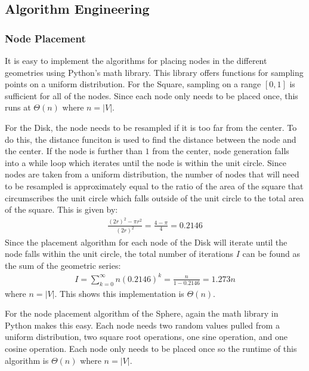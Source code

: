 \documentclass{article}
\begin{document}

    \subsection{Algorithm Engineering}

        \subsubsection{Node Placement}
        It is easy to implement the algorithms for placing nodes in the different geometries using Python's math library. This library offers functions for sampling points on a uniform distribution. For the Square, sampling on a range $[0,1]$ is sufficient for all of the nodes. Since each node only needs to be placed once, this runs at $\Theta(n)$ where $n = |V|$.
        \par
        For the Disk, the node needs to be resampled if it is too far from the center. To do this, the distance funciton is used to find the distance between the node and the center. If the node is further than $1$ from the center, node generation falls into a while loop which iterates until the node is within the unit circle. Since nodes are taken from a uniform distribution, the number of nodes that will need to be resampled is approximately equal to the ratio of the area of the square that circumscribes the unit circle which falls outside of the unit circle to the total area of the square. This is given by:
        \begin{align}
            \frac{(2r)^2-\pi r^2}{(2r)^2} = \frac{4-\pi}{4} = 0.2146
        \end{align}
        Since the placement algorithm for each node of the Disk will iterate until the node falls within the unit circle, the total number of iterations $I$ can be found as the sum of the geometric series:
        \begin{align}
            I = \sum_{k=0}^{\infty} n (0.2146)^k = \frac{n}{1-0.2146} = 1.273n
        \end{align}
        where $n = |V|$. This shows this implementation is $\Theta\left(n\right)$.
        \par
        For the node placement algorithm of the Sphere, again the math library in Python makes this easy. Each node needs two random values pulled from a uniform distribution, two square root operations, one sine operation, and one cosine operation. Each node only needs to be placed once so the runtime of this algorithm is $\Theta(n)$ where $n = |V|$.
\end{document}
